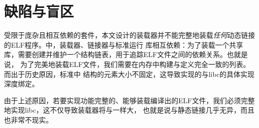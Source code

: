 \section{缺陷与盲区}

受限于庞杂且相互依赖的套件，本文设计的装载器并不能完整地装载\textit{任何}动态链接的ELF程序。中，装载器、链接器与标准运行
库相互依赖：为了装载一个共享库，需要创建并维护一个结构链表，用于追踪ELF文件之间的依赖关系。也就是说，
为了完美地装载ELF文件，我们需要在内存中构建与定义完全一致的列表。而出于历史原因，标准中
结构的元素大小不固定\cite{LinkMap}，这导致实现的与libc的具体实现深度绑定。

由于上述原因，若要实现功能完整的、能够装载编译出的ELF文件，我们必须完整地实现libc，这不仅导致装载器将与一样大，
也就是说与静态链接几乎无异，而且也非常不现实。
